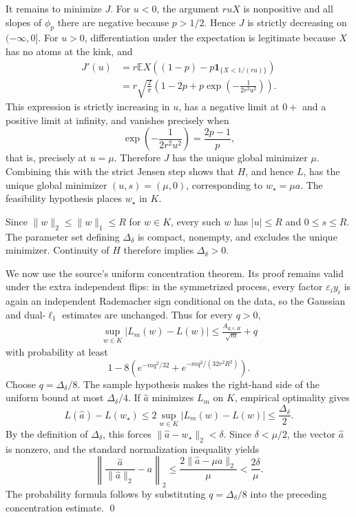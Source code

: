 \documentclass[11pt]{article}
\newcommand{\E}{\mathbb E}
\begin{document}
It remains to minimize $J$. For $u<0$, the argument $ruX$ is nonpositive and
all slopes of $\phi_p$ there are negative because $p>1/2$. Hence $J$ is
strictly decreasing on $(-\infty,0]$. For $u>0$, differentiation under the
expectation is legitimate because $X$ has no atoms at the kink, and
\begin{align*}
 J'(u)
 &=r\E X\left((1-p)-p\mathbf1_{\{X<1/(ru)\}}\right)\\
 &=r\sqrt{\frac2\pi}\left(
 1-2p+p\exp\left(-\frac{1}{2r^2u^2}\right)
 \right).
\end{align*}
This expression is strictly increasing in $u$, has a negative limit at
$0+$ and a positive limit at infinity, and vanishes precisely when
\[
 \exp\left(-\frac{1}{2r^2u^2}\right)=\frac{2p-1}{p},
\]
that is, precisely at $u=\mu$. Therefore $J$ has the unique global minimizer
$\mu$. Combining this with the strict Jensen step shows that $H$, and hence
$L$, has the unique global minimizer $(u,s)=(\mu,0)$, corresponding to
$w_\star=\mu a$. The feasibility hypothesis places $w_\star$ in $K$.

Since $\|w\|_2\leq\|w\|_1\leq R$ for $w\in K$, every such $w$ has
$|u|\leq R$ and $0\leq s\leq R$. The parameter set defining
$\Delta_\delta$ is compact, nonempty, and excludes the unique minimizer.
Continuity of $H$ therefore implies $\Delta_\delta>0$.

We now use the source's uniform concentration theorem. Its proof remains valid
under the extra independent flips: in the symmetrized process, every factor
$\varepsilon_i y_i$ is again an independent Rademacher sign conditional on
the data, so the Gaussian and dual-$\ell_1$ estimates are unchanged. Thus for
every $q>0$,
\begin{align*}
 \sup_{w\in K}|L_m(w)-L(w)|
 \leq \frac{A_{d,r,R}}{\sqrt m}+q
\end{align*}
with probability at least
\[
 1-8\left(e^{-mq^2/32}+e^{-mq^2/(32r^2R^2)}\right).
\]
Choose $q=\Delta_\delta/8$. The sample hypothesis makes the right-hand side
of the uniform bound at most $\Delta_\delta/4$. If $\widehat a$ minimizes
$L_m$ on $K$, empirical optimality gives
\[
 L(\widehat a)-L(w_\star)
 \leq 2\sup_{w\in K}|L_m(w)-L(w)|
 \leq\frac{\Delta_\delta}{2}.
\]
By the definition of $\Delta_\delta$, this forces
$\|\widehat a-w_\star\|_2<\delta$. Since $\delta<\mu/2$, the vector
$\widehat a$ is nonzero, and the standard normalization inequality yields
\[
 \left\|\frac{\widehat a}{\|\widehat a\|_2}-a\right\|_2
 \leq\frac{2\|\widehat a-\mu a\|_2}{\mu}
 <\frac{2\delta}{\mu}.
\]
The probability formula follows by substituting
$q=\Delta_\delta/8$ into the preceding concentration estimate.
\qed
\end{document}
